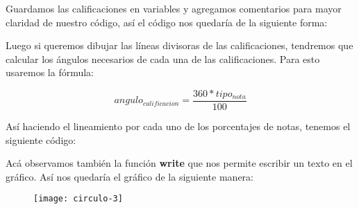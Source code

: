 \begin{enumerate}[{Ejercicio} 1.]
    Guardamos las calificaciones en variables y agregamos comentarios para mayor claridad de nuestro código, así el código nos quedaría de la siguiente forma:\\

    \begin{listing}[H]
    \end{listing}

    Luego si queremos dibujar las líneas divisoras de las calificaciones, tendremos que calcular los ángulos necesarios de cada una de las calificaciones. Para esto usaremos la fórmula:

    \[ angulo_{calificacion} = \frac{360 * tipo_{nota}}{100} \]

    Así haciendo el lineamiento por cada uno de los porcentajes de notas, tenemos el siguiente código:\\

    \begin{listing}[H]
    \end{listing}

    \setcounter{pythonnumber}{40}

    \begin{listing}[H]
    \end{listing}

    Acá observamos también la función \textbf{write} que nos permite escribir un texto en el gráfico. Así nos quedaría el gráfico de la siguiente manera:\\

    \begin{figure}[H]
        \centering
        \texttt{[image: circulo-3]}
    \end{figure}

    \setcounter{pythonnumber}{1}

\end{enumerate}